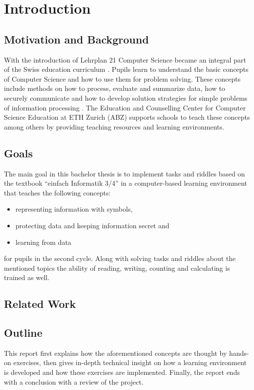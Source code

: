 \chapter{Introduction}

\section{Motivation and Background}

With the introduction of Lehrplan 21 Computer Science became an integral part of the Swiss education curriculum \cite{Lehrplan21}. Pupils learn to understand the basic concepts of Computer Science and how to use them for problem solving. These concepts include methods on how to process, evaluate and summarize data, how to securely communicate and how to develop solution strategies for simple problems of information processing \cite{MedienUndInformatik}. The Education and Counselling Center for Computer Science Education at ETH Zurich (ABZ) supports schools to teach these concepts among others by providing teaching resources and learning environments.

\section{Goals}

The main goal in this bachelor thesis is to implement tasks and riddles based on the textbook “einfach Informatik 3/4” in a computer-based learning environment that teaches the following concepts:
\begin{itemize}
    \item representing information with symbols,
    \item protecting data and keeping information secret and
    \item learning from data
\end{itemize}
for pupils in the second cycle.
Along with solving tasks and riddles about the mentioned topics the ability of reading, writing, counting and calculating is trained as well.

\section{Related Work}


\section{Outline}

This report first explains how the aforementioned concepts are thought by hands-on exercises, then gives in-depth technical insight on how a learning environment is developed and how these exercises are implemented. Finally, the report ends with a conclusion with a review of the project.
